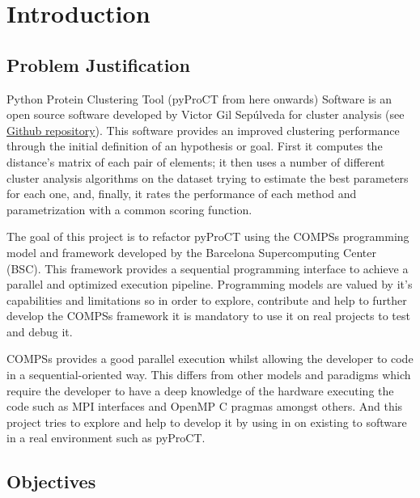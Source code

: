 \chapter{Introduction}

\section{Problem Justification}

Python Protein Clustering Tool (pyProCT from here onwards) Software is an open source software developed by Victor Gil Sepúlveda for cluster analysis (see \hyperref[sec:docs]{Github repository}). This software provides an improved clustering performance through the initial definition of an hypothesis or goal. First it computes the distance's matrix of each pair of elements; it then uses a number of different cluster analysis algorithms on the dataset trying to estimate the best parameters for each one, and, finally, it rates the performance of each method and parametrization with a common scoring function.

The goal of this project is to refactor pyProCT using the COMPSs programming model and framework developed by the Barcelona Supercomputing Center (BSC). This framework provides a sequential programming interface to achieve a parallel and optimized execution pipeline. Programming models are valued by it's capabilities and limitations so in order to explore, contribute and help to further develop the COMPSs framework it is mandatory to use it on real projects to test and debug it.

COMPSs provides a good parallel execution whilst allowing the developer to code in a sequential-oriented way. This differs from other models and paradigms which require the developer to have a deep knowledge of the hardware executing the code such as MPI interfaces and OpenMP C pragmas amongst others. And this project tries to explore and help to develop it by using in on existing to software in a real environment such as pyProCT.



\section{Objectives}

